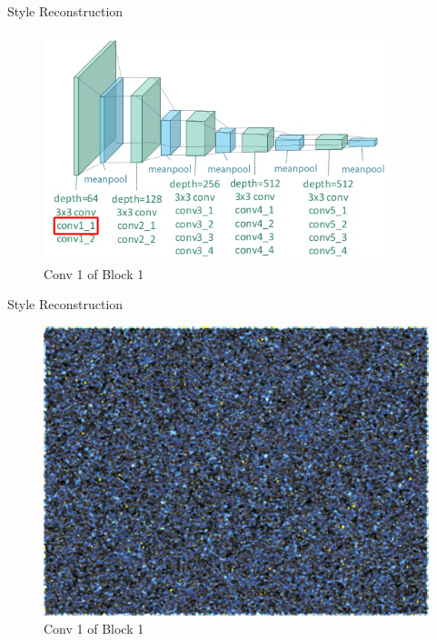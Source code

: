 \documentclass{beamer}
\begin{document}
\begin{frame}{Style Reconstruction}
\begin{figure}[ht]
\centering
\includegraphics[width=0.9\textwidth]{img/vgg19/style/block1_conv1}
\caption*{Conv 1 of Block 1}
\end{figure}
\end{frame}
\begin{frame}{Style Reconstruction}
\begin{figure}[ht]
\centering
\includegraphics[width=.8\textwidth]{img/style/block1_conv1}
\caption*{Conv 1 of Block 1}
\end{figure}
\end{frame}
\end{document}
